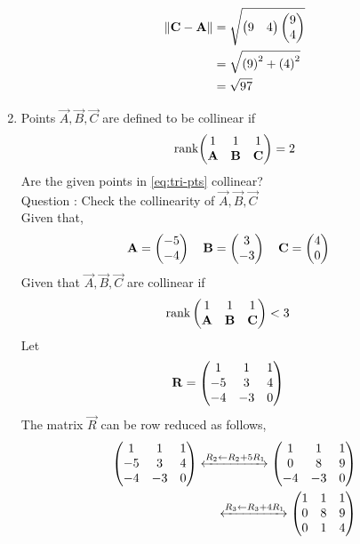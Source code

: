 \documentclass[10pt]{book}
\begin{document}
\begin{enumerate}[label=\thesection.\arabic*.,ref=\thesection.\theenumi]
\begin{align}
    	\norm{\vec{C}-\vec{A}} &= \sqrt{\myvec{9 & 4}\myvec{9\\4}}\\
        &= \sqrt{\brak{9}^2+\brak{4}^2}\\ &=\sqrt{97}
        \label{eq:geo-norm-ca}
    \end{align}
\item   Points $\vec{A}, \vec{B}, \vec{C}$ are defined to be collinear if
\begin{align}
\text{rank}{\ensuremath{\begin{pmatrix}1 & 1 & 1 \\ \mathbf{A}& \mathbf{B}&\mathbf{C}\end{pmatrix}}} = 2
\end{align}
Are the given points in
\eqref{eq:tri-pts}
collinear?
\\          
Question : Check the collinearity of $\vec{A},\vec{B},\vec{C}$
\\
\solution
Given that,
\begin{align}
    \mathbf{A} = \begin{pmatrix}-5\\-4\end{pmatrix}
    \quad
    \mathbf{B} &= \begin{pmatrix}3\\-3\end{pmatrix}
    \quad
    \mathbf{C} = \begin{pmatrix}4\\0\end{pmatrix}
\end{align}
Given that $\vec{A},\vec{B},\vec{C}$ are collinear if
\begin{align}
    \text{rank}\myvec{
    1 & 1 & 1\\
    \vec{A} & \vec{B} & \vec{C} \\
    } &< 3
    \label{eq:1.1.3,2}
\end{align}
Let
\begin{align}
    \mathbf{R}&=\begin{pmatrix}
    1 & 1 & 1
    \\
    -5 & 3 & 4
    \\
    -4 & -3 & 0
    \end{pmatrix}
\end{align}
The matrix $\vec{R}$ can be row reduced as follows,
\begin{align}
    \label{eq:matthrowoperations}
    \myvec{
    1 & 1 & 1
    \\
    -5 & 3 & 4
    \\
    -4 & -3 & 0
    }
     \xleftrightarrow[]{R_2 \leftarrow R_2+5R_1}
    \myvec{ 1 & 1 & 1
    \\
    0 & 8 & 9
    \\
    -4 & -3 & 0
    }
    \\
     \xleftrightarrow[]{R_3\leftarrow R_3+4R_1}
    \myvec{
    1 & 1 & 1
    \\
    0 & 8 & 9
    \\ 0 & 1 & 4
    }
    \\

\end{align}
\end{enumerate}
\end{document}
